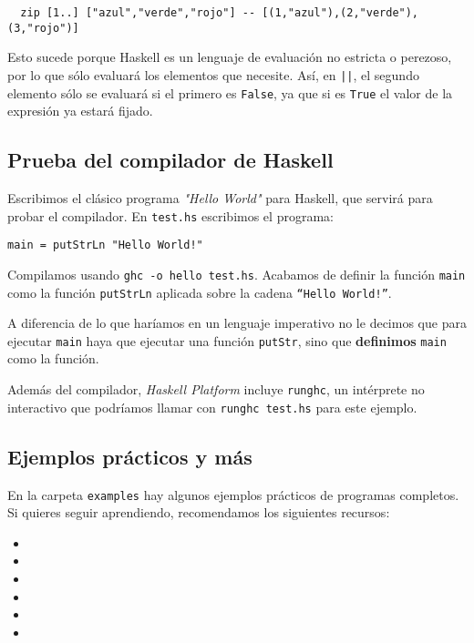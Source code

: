 \begin{fullwidth}
\begin{lstlisting}
  zip [1..] ["azul","verde","rojo"] -- [(1,"azul"),(2,"verde"),(3,"rojo")]
\end{lstlisting}
\end{fullwidth}

Esto sucede porque Haskell es un lenguaje de evaluación no estricta o perezoso, por lo que sólo evaluará
los elementos que necesite. Así, en \texttt{||}, el segundo elemento sólo se evaluará si el
primero es \texttt{False}, ya que si es \texttt{True} el valor de la expresión ya estará fijado.


\subsection{Prueba del compilador de Haskell}

Escribimos el clásico programa \textit{"Hello World"} para Haskell,
que servirá para probar el compilador.
En \texttt{test.hs} escribimos el programa:

\begin{lstlisting}
main = putStrLn "Hello World!"
\end{lstlisting}

Compilamos usando \texttt{ghc -o hello test.hs}.
Acabamos de definir la función \texttt{main} como la función \texttt{putStrLn}
aplicada sobre la cadena \texttt{``Hello World!''}.

A diferencia de lo que haríamos en un lenguaje imperativo no le decimos que
para ejecutar \texttt{main} haya que ejecutar una función \texttt{putStr},
sino que \textbf{definimos} \texttt{main} como la función.

Además del compilador, \textit{Haskell Platform} incluye \texttt{runghc}, un
intérprete no interactivo que podríamos llamar con \texttt{runghc test.hs}
para este ejemplo.

\subsection{Ejemplos prácticos y más}

En la carpeta \texttt{examples} hay algunos ejemplos prácticos de programas
completos. Si quieres seguir aprendiendo, recomendamos los siguientes recursos:

\begin{itemize}
  \item {}
  \item {}
  \item {}
  \item {}
  \item {}
  \item {}
\end{itemize}
